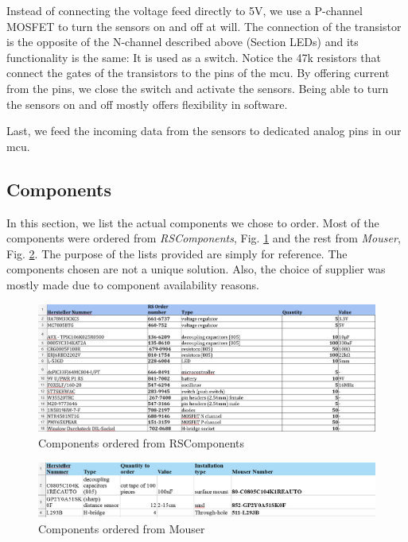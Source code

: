 Instead of connecting the voltage feed directly to 5V, we use a P-channel MOSFET to turn the sensors on and off at will. The connection of the transistor is the opposite of the N-channel described above (Section LEDs) and its functionality is the same: It is used as a switch. Notice the 47k resistors that connect the gates of the transistors to the pins of the mcu. By offering current from the pins, we close the switch and activate the sensors. Being able to turn the sensors on and off mostly offers flexibility in software.

Last, we feed the incoming data from the sensors to dedicated analog pins in our mcu.

\vspace{1cm}


\subsection{Components}

In this section, we list the actual components we chose to order. Most of the components were ordered from \textit{RSComponents}, Fig. \ref{fig:compRS} and the rest from \textit{Mouser}, Fig. \ref{fig:compMou}. The purpose of the lists provided are simply for reference. The components chosen are not a unique solution. Also, the choice of supplier was mostly made due to component availability reasons.

\begin{figure}[htb]
    \centering
    \includegraphics[width=1\textwidth]{figures/hardware/Components1.PNG}
    \caption{Components ordered from RSComponents}
    \label{fig:compRS}
\end{figure}


\begin{figure}[htb]
    \centering
    \includegraphics[width=1\textwidth]{figures/hardware/Components2.PNG}
    \caption{Components ordered from Mouser}
    \label{fig:compMou}
\end{figure}
\FloatBarrier

